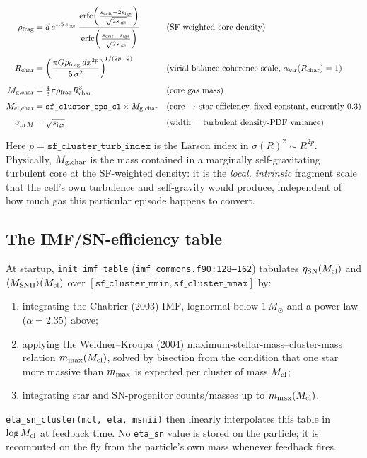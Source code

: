 \documentclass[11pt]{article}
\newcommand{\code}[1]{\texttt{#1}}
\begin{document}
\begin{align}
\rho_{\rm frag} &= d\,e^{1.5\,s_{\rm igs}}\;
  \frac{\mathrm{erfc}\!\left(\frac{s_{\rm crit}-2s_{\rm igs}}{\sqrt{2 s_{\rm igs}}}\right)}
       {\mathrm{erfc}\!\left(\frac{s_{\rm crit}-s_{\rm igs}}{\sqrt{2 s_{\rm igs}}}\right)}
  &&\text{(SF-weighted core density)} \label{eq:rhofrag}\\[4pt]
R_{\rm char} &= \left(\frac{\pi G \rho_{\rm frag}\, dx^{2p}}{5\,\sigma^2}\right)^{\!1/(2p-2)}
  &&\text{(virial-balance coherence scale, } \alpha_{\rm vir}(R_{\rm char})=1\text{)} \label{eq:rchar}\\[4pt]
M_{\rm g,char} &= \tfrac{4}{3}\pi \rho_{\rm frag} R_{\rm char}^3
  &&\text{(core gas mass)} \label{eq:mgchar}\\[4pt]
M_{\rm cl,char} &= \code{sf\_cluster\_eps\_cl} \times M_{\rm g,char}
  &&\text{(core $\to$ star efficiency, fixed constant, currently 0.3)} \label{eq:mclchar}\\[4pt]
\sigma_{\ln M} &= \sqrt{s_{\rm igs}}
  &&\text{(width $=$ turbulent density-PDF variance)} \label{eq:sigmalnm}
\end{align}

Here $p=\code{sf\_cluster\_turb\_index}$ is the Larson index in
$\sigma(R)^2 \sim R^{2p}$. Physically, $M_{\rm g,char}$ is the mass
contained in a marginally self-gravitating turbulent core at the
SF-weighted density: it is the \emph{local, intrinsic} fragment scale that
the cell's own turbulence and self-gravity would produce, independent of
how much gas this particular episode happens to convert.

\subsection{The IMF/SN-efficiency table}

At startup, \code{init\_imf\_table} (\code{imf\_commons.f90:128--162})
tabulates $\eta_{\rm SN}(M_{\rm cl})$ and $\langle M_{\rm SNII}
\rangle(M_{\rm cl})$ over $[\code{sf\_cluster\_mmin}, \code{sf\_cluster\_mmax}]$
by:
\begin{enumerate}
  \item integrating the Chabrier (2003) IMF, lognormal below $1\,M_\odot$
        and a power law ($\alpha=2.35$) above;
  \item applying the Weidner--Kroupa (2004) maximum-stellar-mass--cluster-mass
        relation $m_{\rm max}(M_{\rm cl})$, solved by bisection from the
        condition that one star more massive than $m_{\rm max}$ is expected
        per cluster of mass $M_{\rm cl}$;
  \item integrating star and SN-progenitor counts/masses up to $m_{\rm
        max}(M_{\rm cl})$.
\end{enumerate}
\code{eta\_sn\_cluster(mcl, eta, msnii)} then linearly interpolates this
table in $\log M_{\rm cl}$ at feedback time. No \code{eta\_sn} value is
stored on the particle; it is recomputed on the fly from the particle's own
mass whenever feedback fires.
\end{document}
